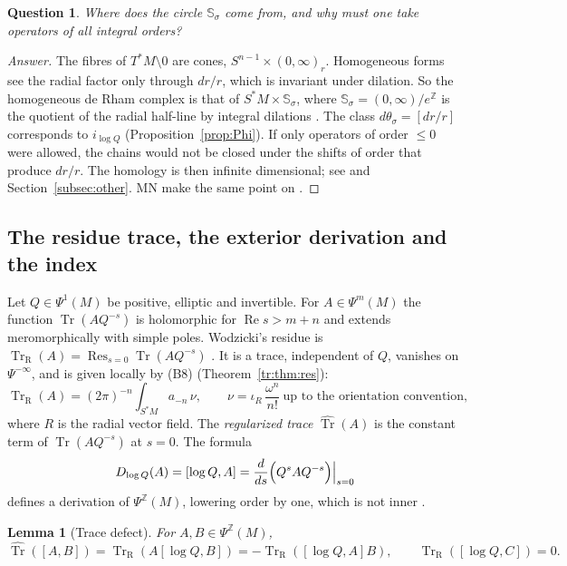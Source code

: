 \documentclass[11pt,oneside,reqno]{article}
\DeclareMathOperator{\Tr}{Tr}
\DeclareMathOperator{\Res}{Res}
\newcommand{\Z}{\mathbb Z}
\newcommand{\TrR}{\Tr_{\mathrm R}}
\newcommand{\Ssig}{\mathbb S_\sigma}
\newcommand{\lQ}{\log Q}
\theoremstyle{plain}
\newtheorem{lemma}[theorem]{Lemma}
\newtheorem{question}[theorem]{Question}
\theoremstyle{definition}
\theoremstyle{remark}
\newenvironment{answer}{\begin{proof}[Answer]}{\end{proof}}
\begin{document}
\begin{question}
Where does the circle \(\Ssig\) come from, and why must one take operators
of \emph{all} integral orders?
\end{question}
\begin{answer}
The fibres of \(T^*M\setminus0\) are cones, \(S^{n-1}\times(0,\infty)_r\).
Homogeneous forms see the radial factor only through \(dr/r\), which is
invariant under dilation. So the homogeneous de Rham complex is that of
\(S^*M\times\Ssig\), where \(\Ssig=(0,\infty)/e^{\Z}\) is the quotient of
the radial half-line by integral dilations \cite[\S1]{MN}. The class
\(d\theta_\sigma=[dr/r]\) corresponds to \(i_{\lQ}\)
(Proposition~\ref{prop:Phi}). If only operators of order \(\le0\) were
allowed, the chains would not be closed under the shifts of order that
produce \(dr/r\). The homology is then infinite dimensional; see
\cite[\S15]{MN} and Section~\ref{subsec:other}. MN make the same point on
\cite[p.~3]{MN}.
\end{answer}

\subsection{The residue trace, the exterior derivation and the index}
Let \(Q\in\Psi^1(M)\) be positive, elliptic and invertible. For
\(A\in\Psi^m(M)\) the function \(\Tr(AQ^{-s})\) is holomorphic for
\(\operatorname{Re}s>m+n\) and extends meromorphically with simple poles.
Wodzicki's residue is \(\TrR(A)=\Res_{s=0}\Tr(AQ^{-s})\) \cite[(2)]{MN}.
It is a trace, independent of \(Q\), vanishes on \(\Psi^{-\infty}\), and
is given locally by (B8) (Theorem~\ref{tr:thm:res}):
\begin{equation}\label{eq:wodzicki}
 \TrR(A)=(2\pi)^{-n}\int_{S^*M}a_{-n}\,\nu,\qquad
 \nu=\iota_{R}\,\frac{\omega^n}{n!}\ \text{up to the orientation convention,}
\end{equation}
where \(R\) is the radial vector field. The \emph{regularized trace}
\(\widehat{\Tr}(A)\) is the constant term of \(\Tr(AQ^{-s})\) at \(s=0\).
The formula
\[
 D_{\lQ}(A)=[\lQ,A]=\frac{d}{ds}\Bigl(Q^sAQ^{-s}\Bigr)\Big|_{s=0}
\]
defines a derivation of \(\Psi^{\Z}(M)\), lowering order by one, which is
not inner \cite[\S6]{MN}.

\begin{lemma}[Trace defect]\label{lem:closeddefect}
For \(A,B\in\Psi^{\Z}(M)\),
\[
 \widehat{\Tr}([A,B])=\TrR(A[\lQ,B])=-\TrR([\lQ,A]B),\qquad
 \TrR([\lQ,C])=0 .
\]
\end{lemma}
\end{document}
